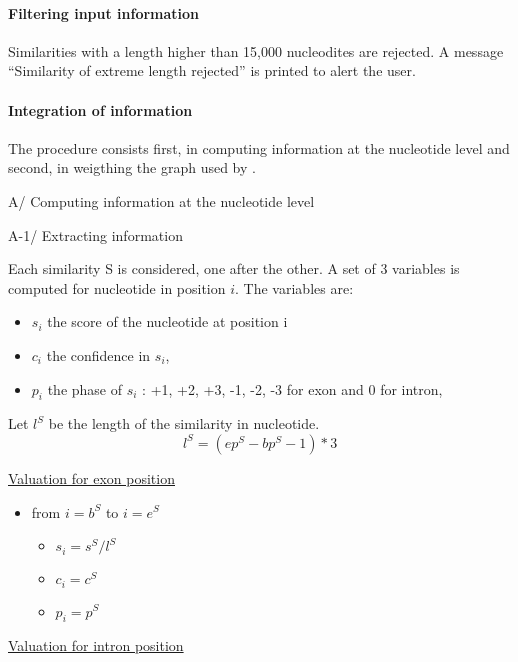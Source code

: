 \paragraph{Filtering input information}

Similarities with a length higher than 15,000 nucleodites are
rejected. A message ``Similarity of extreme length rejected'' is
printed to alert the user.

\paragraph{Integration of information}

The procedure consists first, in computing information at the
nucleotide level and second, in weigthing the graph used by \EuGene.

A/ Computing information at the nucleotide level

A-1/ Extracting information

Each similarity S is considered, one after the other.  A set of 3
variables is computed for nucleotide in position $i$. The variables
are:
\begin{itemize}
\item $s_i$ the score of the nucleotide at position i
\item $c_i$ the confidence in $s_i$,
\item $p_i$ the phase of $s_i$ : +1, +2, +3, -1, -2, -3 for exon and 0 for intron,
\end{itemize}
Let $l^S$ be the length of the similarity in nucleotide.
\[l^S = (ep^S -bp^S -1)*3\]

\underline{Valuation for exon position} \\

\begin{itemize}
\item from $i = b^S$ to  $i = e^S$
  \begin{itemize}
  \item $s_i = s^S / l^S$
  \item $c_i = c^S$
  \item $p_i = p^S$
  \end{itemize}
\end{itemize}

\underline{Valuation for intron position}\\

